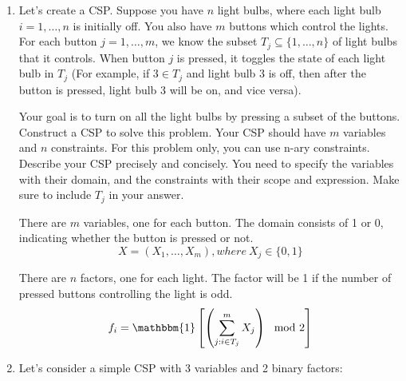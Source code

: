 \documentclass[10pt]{article}
\begin{document}
\begin{enumerate}[label=(\alph*)]

  \item Let's create a CSP. Suppose you have $n$ light bulbs, where each light bulb $i = 1, \dots, n$ is initially off. You also have $m$ buttons which control the lights. For each button $j = 1, \dots, m$, we know the subset $T_j \subseteq \{1, \dots, n\}$ of light bulbs that it controls. When button $j$ is pressed, it toggles the state of each light bulb in $T_j$ (For example, if $3 \in T_j$ and light bulb 3 is off, then after the button is pressed, light bulb 3 will be on, and vice versa).
  
  Your goal is to turn on all the light bulbs by pressing a subset of the buttons. Construct a CSP to solve this problem. Your CSP should have $m$ variables and $n$ constraints. For this problem only, you can use n-ary constraints. Describe your CSP precisely and concisely. You need to specify the variables with their domain, and the constraints with their scope and expression. Make sure to include $T_j$ in your answer.
  
  There are $m$ variables, one for each button. The domain consists of 1 or 0, indicating whether the button is pressed or not.
  $$X = (X_1, \dots, X_m), where \ X_j \in \{0, 1\}$$
  
  There are $n$ factors, one for each light. The factor will be 1 if the number of pressed buttons controlling the light is odd.
  $$f_i = \mathbbm{1}\left[\left(\sum_{j : i \in T_j}^{m} X_j \right) \mod 2\right]$$
  
  \item Let's consider a simple CSP with 3 variables and 2 binary factors:
  
  \begin{center}
	\end{center}
	

\end{enumerate}
\end{document}
